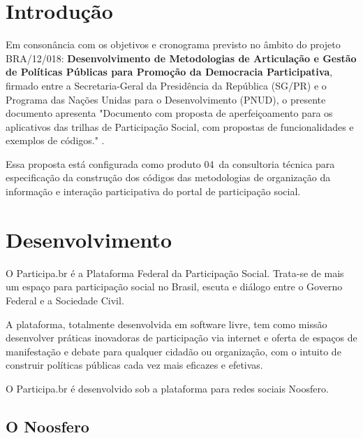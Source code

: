 \documentclass[12pt]{article}
\newcommand{\ProductNumber}{04}
\newcommand{\ProductDescription}{"Documento com proposta de aperfeiçoamento
  para os aplicativos das trilhas de Participação Social, com propostas de
  funcionalidades e exemplos de códigos."
}
\newcommand{\PalavrasChave}{observatório, tag, categoria, comentário, etiqueta, status}
\begin{document}




\tableofcontents
\newpage

\begin{abstract}
Proposta de ferramenta para acompanhamento de temas específicos do portal
Participa.br e ferramenta para sistematização de consultas a partir de debates
por comentários em parágrafos e trechos. \\

{\bf Palavras-chave:} \PalavrasChave.
\end{abstract}
\newpage

\section{Introdução}

Em consonância com os objetivos e cronograma previsto no âmbito do
projeto BRA/12/018:
\textbf{Desenvolvimento de Metodologias de Articulação e Gestão de
Políticas Públicas para Promoção da Democracia Participativa},
firmado entre a Secretaria-Geral da Presidência da República
(SG/PR) e o Programa das Nações Unidas para o Desenvolvimento (PNUD),
o presente documento apresenta \ProductDescription.

Essa proposta está configurada como produto \ProductNumber~da consultoria técnica
para especificação da construção dos códigos das metodologias de
organização da informação e interação participativa do portal de
participação social.

\section{Desenvolvimento}

O Participa.br é a Plataforma Federal da Participação Social. Trata-se de mais
um espaço para participação social no Brasil, escuta e diálogo entre o Governo
Federal e a Sociedade Civil. 

A plataforma, totalmente desenvolvida em software livre, tem como missão
desenvolver práticas inovadoras de participação via internet e oferta de
espaços de manifestação e debate para qualquer cidadão ou organização, com o
intuito de construir políticas públicas cada vez mais eficazes e efetivas.

O Participa.br é desenvolvido sob a plataforma para redes sociais Noosfero.

\subsection{O Noosfero}
\end{document}

